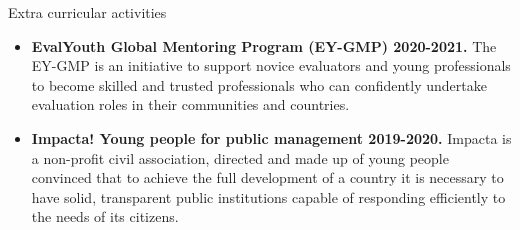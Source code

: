 \documentclass{resume} %
\begin{document}
\begin{rSection}{Extra curricular activities} 
\begin{itemize}
   \item 	\textbf{EvalYouth Global Mentoring Program (EY-GMP) 2020-2021.} {The EY-GMP is an initiative to support novice evaluators and young professionals to become skilled and trusted professionals who can confidently undertake evaluation roles in their communities and countries.}
   \item 	\textbf{Impacta! Young people for public management 2019-2020.} {Impacta is a non-profit civil association, directed and made up of young people convinced that to achieve the full development of a country it is necessary to have solid, transparent public institutions capable of responding efficiently to the needs of its citizens.}
  \end{itemize}


\end{rSection}
\end{document}
